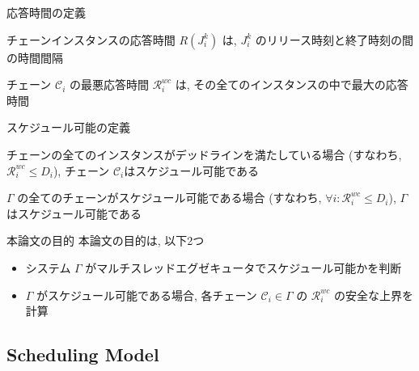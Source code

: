 \begin{frame}{応答時間の定義}
    \begin{definition}
        チェーンインスタンスの応答時間 $R\left(J_{i}^{k}\right)$ は,  $J_{i}^{k}$ のリリース時刻と終了時刻の間の時間間隔
    \end{definition}
    \begin{definition}
        チェーン $\mathcal{C}_{i}$ の最悪応答時間 $\mathcal{R}_{i}^{w c}$ は, その全てのインスタンスの中で最大の応答時間
    \end{definition}
\end{frame}

\begin{frame}{スケジュール可能の定義}
    \begin{definition}
        チェーンの全てのインスタンスがデッドラインを満たしている場合 (すなわち, $\mathcal{R}_{i}^{w c} \leq D_{i}$), チェーン $\mathcal{C}_{i}$はスケジュール可能である
    \end{definition}
    \begin{definition}
        $\Gamma$ の全てのチェーンがスケジュール可能である場合 (すなわち, $\forall i: \mathcal{R}_{i}^{w c} \leq D_{i}$), $\Gamma$はスケジュール可能である
    \end{definition}
\end{frame}

\begin{frame}{本論文の目的}
    本論文の目的は, 以下2つ
    \begin{itemize}
        \item システム $\Gamma$ がマルチスレッドエグゼキュータでスケジュール可能かを判断
        \item $\Gamma$ がスケジュール可能である場合, 各チェーン $\mathcal{C}_{i} \in \Gamma$ の $\mathcal{R}_{i}^{w c}$ の安全な上界を計算
    \end{itemize}
\end{frame}


\subsection{Scheduling Model}
\label{ssec: scheduling_model}


